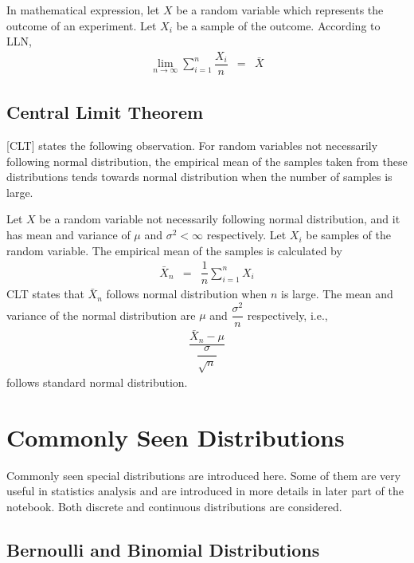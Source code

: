 In mathematical expression, let $X$ be a random variable which represents the outcome of an experiment. Let $X_i$ be a sample of the outcome. According to LLN,
\begin{eqnarray}
	\lim_{n\rightarrow\infty} \sum_{i=1}^{n}\dfrac{X_i}{n} &=& \bar{X} \nonumber
\end{eqnarray}

\subsection{Central Limit Theorem}

[CLT] states the following observation. For  random variables not necessarily following normal distribution, the empirical mean of the samples taken from these distributions tends towards normal distribution when the number of samples is large.

Let $X$ be a random variable not necessarily following normal distribution, and it has mean and variance of $\mu$ and $\sigma^2<\infty$ respectively. Let $X_i$ be samples of the random variable. The empirical mean of the samples is calculated by
\begin{eqnarray}
	\bar{X}_n &=& \dfrac{1}{n}\sum_{i=1}^{n}X_i \nonumber
\end{eqnarray}
CLT states that $\bar{X}_n$ follows normal distribution when $n$ is large. The mean and variance of the normal distribution are $\mu$ and $\dfrac{\sigma^2}{n}$ respectively, i.e.,
\begin{eqnarray}
	\dfrac{\bar{X}_n-\mu}{\dfrac{\sigma}{\sqrt{n}}} \nonumber
\end{eqnarray}
follows standard normal distribution. 

\section{Commonly Seen Distributions}

Commonly seen special distributions are introduced here. Some of them are very useful in statistics analysis and are introduced in more details in later part of the notebook. Both discrete and continuous distributions are considered.

\subsection{Bernoulli and Binomial Distributions}

